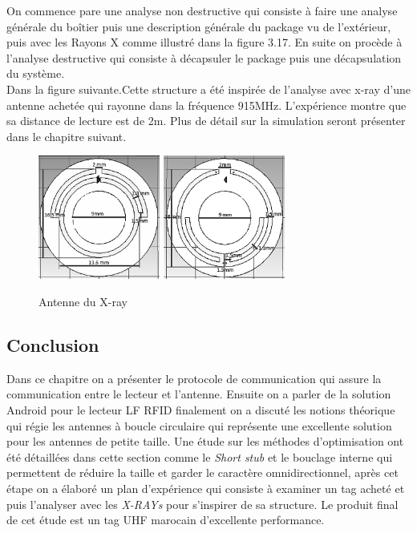 \documentclass[11pt, a4paper, twoside]{book}
\begin{document}
On commence pare une analyse non destructive qui consiste à faire une analyse générale du boîtier puis une description générale du package vu de l’extérieur, puis avec les Rayons X comme illustré dans la figure 3.17. En suite on procède à l'analyse destructive qui consiste à décapsuler le package puis une décapsulation du système.\\

Dans la figure suivante.Cette structure a été inspirée de l'analyse avec x-ray d'une antenne achetée qui rayonne dans la fréquence 915MHz. L'expérience montre que sa distance de lecture est de 2m. Plus de détail sur la simulation seront présenter dans le chapitre suivant.\\

\begin{figure}[H]
\centering
\includegraphics[width=4cm]{front11}
\includegraphics[width=4cm]{back22}
\caption{Antenne du X-ray}
\end{figure}
\subsection{Conclusion}
Dans ce chapitre on a présenter le protocole de communication qui assure la communication entre le lecteur et l'antenne. Ensuite on a parler de la solution Android pour le lecteur LF RFID finalement on a discuté les notions théorique qui régie les antennes à boucle circulaire qui représente une excellente solution pour les antennes de petite taille. Une étude sur les méthodes d'optimisation ont été détaillées dans cette section comme le \emph{Short stub} et le bouclage interne qui permettent de réduire la taille et garder le caractère omnidirectionnel, après cet étape on a élaboré un plan d'expérience qui consiste à examiner un tag acheté et puis l'analyser avec les \emph{X-RAYs} pour s'inspirer de sa structure. Le produit final de cet étude est un tag UHF marocain d'excellente performance.
\end{document}
